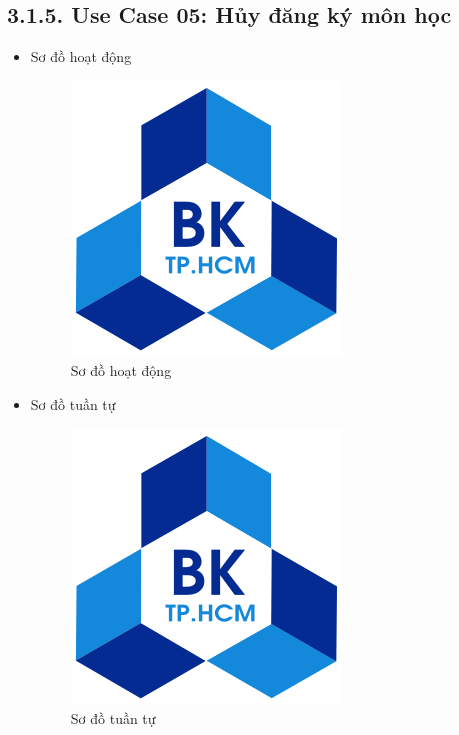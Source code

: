 \subsection*{3.1.5. Use Case 05: Hủy đăng ký môn học}
\begin{itemize}
    \item Sơ đồ hoạt động
    \begin{figure}[H]
    \centering
    \includegraphics[scale=0.5 ]{Picture/hcmut.png}
    \caption{Sơ đồ hoạt động }
    \end{figure}
    \item Sơ đồ tuần tự
    \begin{figure}[H]
    \centering
    \includegraphics[scale=0.5 ]{Picture/hcmut.png}
    \caption{Sơ đồ tuần tự }
    \end{figure}
\end{itemize}
